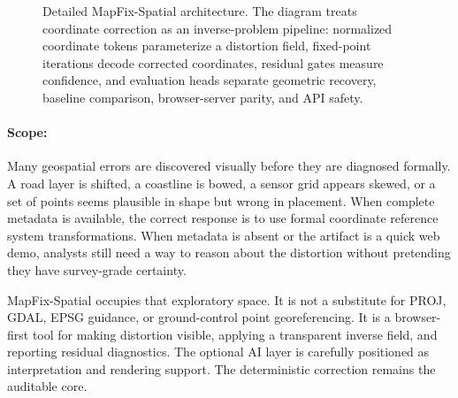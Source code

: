 \documentclass{article}
\makeatletter
\renewcommand{\scriptsize}{\@setfontsize\scriptsize\@viipt\@viiipt}
\renewcommand{\tiny}{\@setfontsize\tiny\@vipt\@viipt}
\makeatother
\begin{document}
\begin{figure}[t]
\caption{Detailed MapFix-Spatial architecture. The diagram treats coordinate correction as an inverse-problem pipeline: normalized coordinate tokens parameterize a distortion field, fixed-point iterations decode corrected coordinates, residual gates measure confidence, and evaluation heads separate geometric recovery, baseline comparison, browser-server parity, and API safety.}
\label{fig:mapfix-architecture}
\end{figure}

\paragraph{Scope:}

Many geospatial errors are discovered visually before they are diagnosed formally. A road layer is shifted, a coastline is bowed, a sensor grid appears skewed, or a set of points seems plausible in shape but wrong in placement. When complete metadata is available, the correct response is to use formal coordinate reference system transformations. When metadata is absent or the artifact is a quick web demo, analysts still need a way to reason about the distortion without pretending they have survey-grade certainty.

MapFix-Spatial occupies that exploratory space. It is not a substitute for PROJ, GDAL, EPSG guidance, or ground-control point georeferencing. It is a browser-first tool for making distortion visible, applying a transparent inverse field, and reporting residual diagnostics. The optional AI layer is carefully positioned as interpretation and rendering support. The deterministic correction remains the auditable core.
\end{document}
